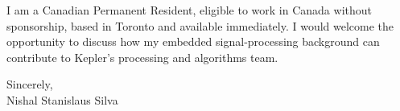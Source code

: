 \documentclass[11pt]{article}
\begin{document}
\vspace{1em}
\noindent I am a Canadian Permanent Resident, eligible to work in Canada without sponsorship, based in Toronto and available immediately. I would welcome the opportunity to discuss how my embedded signal-processing background can contribute to Kepler's processing and algorithms team.

\vspace{1.5em}
\noindent Sincerely, \\
Nishal Stanislaus Silva
\end{document}
